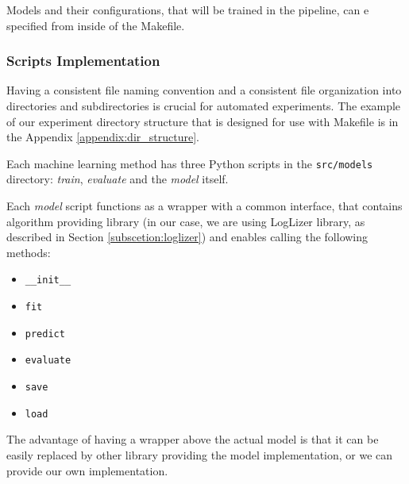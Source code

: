 \begin{figure}[!h] 
\end{figure}

Models and their configurations, that will be trained in the pipeline, can e specified from inside of the Makefile.

\subsubsection*{Scripts Implementation}
 Having a consistent file naming convention and a consistent file organization into directories and subdirectories is crucial for automated experiments. The example of our experiment directory structure that is designed for use with Makefile is in the Appendix \ref{appendix:dir_structure}.
 
 Each machine learning method has three Python scripts in the \texttt{src/models} directory: \textit{train}, \textit{evaluate} and the \textit{model} itself. 
 
 Each \textit{model} script functions as a wrapper with a common interface, that contains algorithm providing library (in our case, we are using LogLizer library, as described in Section \ref{subscetion:loglizer}) and enables calling the following methods:
 
\begin{itemize}
    \item \texttt{\_\_init\_\_}
    \item \texttt{fit}
    \item \texttt{predict}
    \item \texttt{evaluate}
    \item \texttt{save}
    \item \texttt{load}
\end{itemize}

The advantage of having a wrapper above the actual model is that it can be easily replaced by other library providing the model implementation, or we can provide our own implementation.

